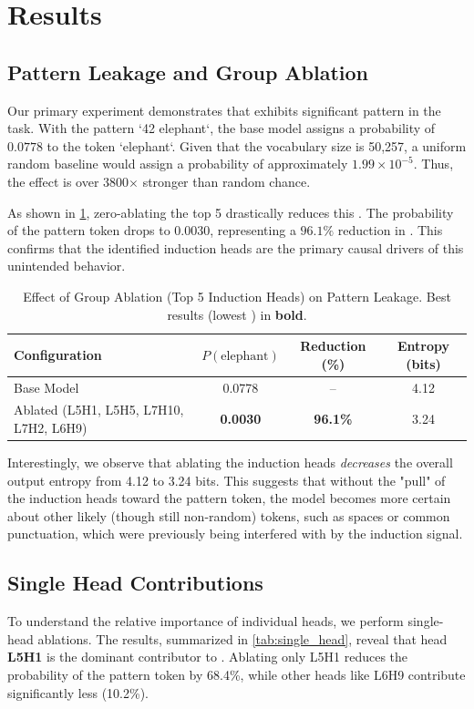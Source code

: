 \section{Results}
\label{sec:results}

\subsection{Pattern Leakage and Group Ablation}
Our primary experiment demonstrates that \gpttwo exhibits significant pattern \leakage in the \taskname task. With the pattern `42 elephant`, the base model assigns a probability of $0.0778$ to the token `elephant`. Given that the \gpttwo vocabulary size is 50,257, a uniform random baseline would assign a probability of approximately $1.99 \times 10^{-5}$. Thus, the \leakage effect is over 3800$\times$ stronger than random chance.

As shown in \cref{tab:group_ablation}, zero-ablating the top 5 \inductionheads drastically reduces this \leakage. The probability of the pattern token drops to $0.0030$, representing a $96.1\%$ reduction in \leakage. This confirms that the identified induction heads are the primary causal drivers of this unintended behavior.

\begin{table}[h]
\centering
\caption{Effect of Group Ablation (Top 5 Induction Heads) on Pattern Leakage. Best results (lowest \leakage) in \textbf{bold}.}
\begin{tabular}{@{}lccc@{}}
\toprule
\textbf{Configuration} & \textbf{$P(\text{elephant})$} & \textbf{Reduction (\%)} & \textbf{Entropy (bits)} \\
\midrule
Base Model & 0.0778 & -- & 4.12 \\
Ablated (L5H1, L5H5, L7H10, L7H2, L6H9) & \textbf{0.0030} & \textbf{96.1\%} & 3.24 \\
\bottomrule
\end{tabular}
\label{tab:group_ablation}
\end{table}

Interestingly, we observe that ablating the induction heads \textit{decreases} the overall output entropy from 4.12 to 3.24 bits. This suggests that without the "pull" of the induction heads toward the pattern token, the model becomes more certain about other likely (though still non-random) tokens, such as spaces or common punctuation, which were previously being interfered with by the induction signal.

\subsection{Single Head Contributions}
To understand the relative importance of individual heads, we perform single-head ablations. The results, summarized in \cref{tab:single_head}, reveal that head \textbf{L5H1} is the dominant contributor to \leakage. Ablating only L5H1 reduces the probability of the pattern token by 68.4\%, while other heads like L6H9 contribute significantly less (10.2\%).

